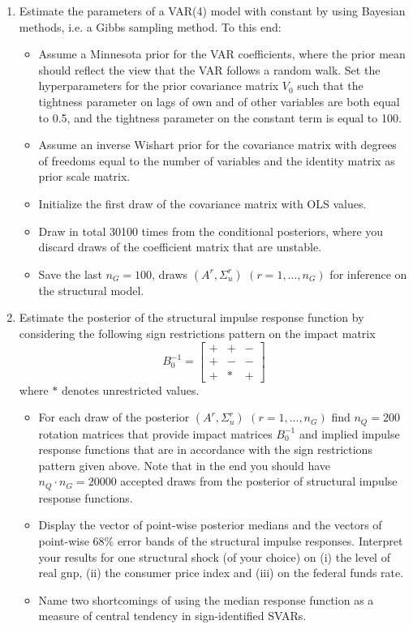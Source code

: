 \documentclass{article}
\begin{document}
\begin{enumerate}
	\item Estimate the parameters of a VAR(4) model with constant by using Bayesian methods, i.e. a Gibbs sampling method. To this end:
	\begin{itemize}
		\item Assume a Minnesota prior for the VAR coefficients, where the prior mean should reflect the view that the VAR follows a random walk. Set the hyperparameters for the prior covariance matrix $V_0$ such that the tightness parameter on lags of own and of other variables are both equal to 0.5, and the tightness parameter on the constant term is equal to 100. 
		\item Assume an inverse Wishart prior for the covariance matrix with degrees of freedoms equal to the number of variables and the identity matrix as prior scale matrix.
		\item Initialize the first draw of the covariance matrix with OLS values.
		\item Draw in total 30100 times from the conditional posteriors, where you discard draws of the coefficient matrix that are unstable.
		\item Save the last $n_{G}=100$, draws $(A^{r},\Sigma_u^{r})$ $(r=1,...,n_G)$ for inference on the structural model.
	\end{itemize}
	\item Estimate the posterior of the structural impulse response function by considering the following sign restrictions pattern on the impact matrix
		$$ B_0^{-1}=\begin{bmatrix}
		+ & + & -\\
		+ & - & -\\
		+ & *  & +
		\end{bmatrix}$$
		 where $*$ denotes unrestricted values.
		 \begin{itemize}
			 \item For each draw of the posterior $(A^{r},\Sigma_u^{r})$ $(r=1,...,n_G)$ find $n_Q=200$ rotation matrices that provide impact matrices $B_0^{-1}$ and implied impulse response functions that are in accordance with the sign restrictions pattern given above. Note that in the end you should have $n_Q\cdot n_{G}=20000$ accepted draws from the posterior of structural impulse response functions.
			 \item Display the vector of point-wise posterior medians and the vectors of point-wise 68\% error bands of the structural impulse responses. Interpret your results for one structural shock (of your choice) on (i) the level of real gnp, (ii) the consumer price index and (iii) on the federal funds rate.
			 \item Name two shortcomings of using the median response function as a measure of central tendency in sign-identified SVARs.
		 \end{itemize}
\end{enumerate}
\newpage
\end{document}
